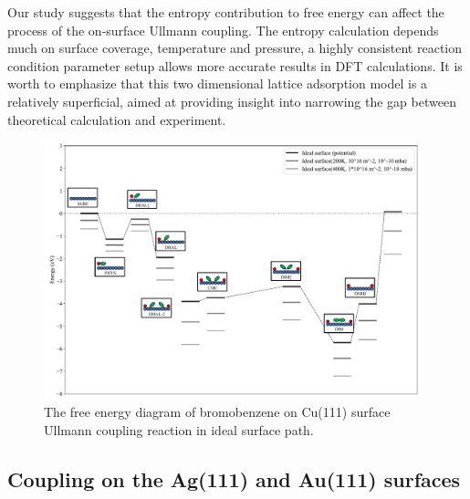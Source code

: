 \documentclass[%
 reprint,
 amsmath,amssymb,
 aps,
prb,
floatfix,
]{revtex4-2}
\begin{document}
{Our study suggests that the entropy contribution to free energy can affect the process of the on-surface Ullmann coupling. The entropy calculation depends much on surface coverage, temperature and pressure, a highly consistent reaction condition parameter setup allows more accurate results in DFT calculations. It is worth to emphasize that this two dimensional lattice adsorption model is a relatively superficial, aimed at providing insight into narrowing the gap between theoretical calculation and experiment. 
}

\begin{figure}[hbt]
\centering
\includegraphics[width=0.98\textwidth]{Fig/entropy-correction.pdf}
\caption{The free energy diagram of bromobenzene on Cu(111) surface Ullmann coupling reaction in ideal surface path.}
\label{fig:entropy}
\end{figure}

\fi

\ifdefined\INTERNAL
\subsection{Coupling on the Ag(111) and Au(111) surfaces}
\fi
\end{document}
